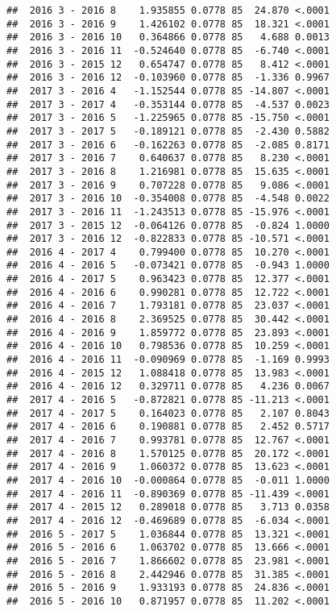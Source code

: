 \documentclass[
]{article}
\begin{document}
\begin{verbatim}
##  2016 3 - 2016 8    1.935855 0.0778 85  24.870 <.0001 
##  2016 3 - 2016 9    1.426102 0.0778 85  18.321 <.0001 
##  2016 3 - 2016 10   0.364866 0.0778 85   4.688 0.0013 
##  2016 3 - 2016 11  -0.524640 0.0778 85  -6.740 <.0001 
##  2016 3 - 2015 12   0.654747 0.0778 85   8.412 <.0001 
##  2016 3 - 2016 12  -0.103960 0.0778 85  -1.336 0.9967 
##  2017 3 - 2016 4   -1.152544 0.0778 85 -14.807 <.0001 
##  2017 3 - 2017 4   -0.353144 0.0778 85  -4.537 0.0023 
##  2017 3 - 2016 5   -1.225965 0.0778 85 -15.750 <.0001 
##  2017 3 - 2017 5   -0.189121 0.0778 85  -2.430 0.5882 
##  2017 3 - 2016 6   -0.162263 0.0778 85  -2.085 0.8171 
##  2017 3 - 2016 7    0.640637 0.0778 85   8.230 <.0001 
##  2017 3 - 2016 8    1.216981 0.0778 85  15.635 <.0001 
##  2017 3 - 2016 9    0.707228 0.0778 85   9.086 <.0001 
##  2017 3 - 2016 10  -0.354008 0.0778 85  -4.548 0.0022 
##  2017 3 - 2016 11  -1.243513 0.0778 85 -15.976 <.0001 
##  2017 3 - 2015 12  -0.064126 0.0778 85  -0.824 1.0000 
##  2017 3 - 2016 12  -0.822833 0.0778 85 -10.571 <.0001 
##  2016 4 - 2017 4    0.799400 0.0778 85  10.270 <.0001 
##  2016 4 - 2016 5   -0.073421 0.0778 85  -0.943 1.0000 
##  2016 4 - 2017 5    0.963423 0.0778 85  12.377 <.0001 
##  2016 4 - 2016 6    0.990281 0.0778 85  12.722 <.0001 
##  2016 4 - 2016 7    1.793181 0.0778 85  23.037 <.0001 
##  2016 4 - 2016 8    2.369525 0.0778 85  30.442 <.0001 
##  2016 4 - 2016 9    1.859772 0.0778 85  23.893 <.0001 
##  2016 4 - 2016 10   0.798536 0.0778 85  10.259 <.0001 
##  2016 4 - 2016 11  -0.090969 0.0778 85  -1.169 0.9993 
##  2016 4 - 2015 12   1.088418 0.0778 85  13.983 <.0001 
##  2016 4 - 2016 12   0.329711 0.0778 85   4.236 0.0067 
##  2017 4 - 2016 5   -0.872821 0.0778 85 -11.213 <.0001 
##  2017 4 - 2017 5    0.164023 0.0778 85   2.107 0.8043 
##  2017 4 - 2016 6    0.190881 0.0778 85   2.452 0.5717 
##  2017 4 - 2016 7    0.993781 0.0778 85  12.767 <.0001 
##  2017 4 - 2016 8    1.570125 0.0778 85  20.172 <.0001 
##  2017 4 - 2016 9    1.060372 0.0778 85  13.623 <.0001 
##  2017 4 - 2016 10  -0.000864 0.0778 85  -0.011 1.0000 
##  2017 4 - 2016 11  -0.890369 0.0778 85 -11.439 <.0001 
##  2017 4 - 2015 12   0.289018 0.0778 85   3.713 0.0358 
##  2017 4 - 2016 12  -0.469689 0.0778 85  -6.034 <.0001 
##  2016 5 - 2017 5    1.036844 0.0778 85  13.321 <.0001 
##  2016 5 - 2016 6    1.063702 0.0778 85  13.666 <.0001 
##  2016 5 - 2016 7    1.866602 0.0778 85  23.981 <.0001 
##  2016 5 - 2016 8    2.442946 0.0778 85  31.385 <.0001 
##  2016 5 - 2016 9    1.933193 0.0778 85  24.836 <.0001 
##  2016 5 - 2016 10   0.871957 0.0778 85  11.202 <.0001 

\end{verbatim}
\end{document}
